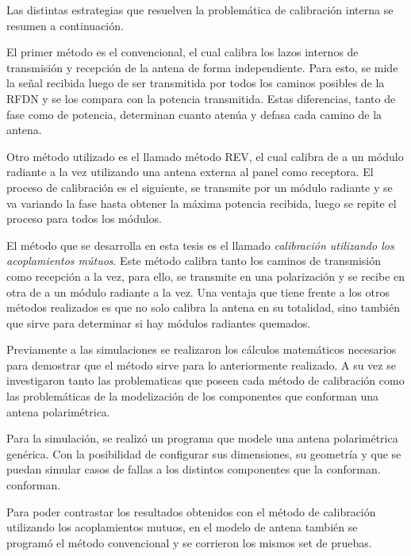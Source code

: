 Las distintas estrategias que resuelven la problemática de calibración interna se resumen a continuación. 

El primer método es el convencional, el cual calibra los lazos internos de transmisión y recepción de la antena de forma 
independiente. Para esto, se mide la señal recibida luego de ser transmitida por todos los caminos posibles de la RFDN
y se los compara con la potencia transmitida. Estas diferencias, tanto de fase como de potencia, determinan cuanto atenúa
y defasa cada camino de la antena.

Otro método utilizado es el llamado método REV, el cual calibra de a un módulo radiante a la vez utilizando una antena externa
al panel como receptora. El proceso de calibración es el siguiente, se transmite por un módulo radiante y se va variando la 
fase hasta obtener la máxima potencia recibida, luego se repite el proceso para todos los módulos. 

El método que se desarrolla en esta tesis es el llamado \emph{calibración utilizando los acoplamientos mútuos}. Este método calibra 
tanto los caminos de transmisión como recepción a la vez, para ello, se transmite en una polarización y se recibe en otra de 
a un módulo radiante a la vez. Una ventaja que tiene frente a los otros métodos realizados es que no solo calibra la antena 
en su totalidad, sino también que sirve para determinar si hay módulos radiantes quemados.

Previamente a las simulaciones se realizaron los cálculos matemáticos necesarios para demostrar que el método sirve para 
lo anteriormente realizado. A su vez se investigaron tanto las problematicas que poseen cada método de calibración como
las problemáticas de la modelización de los componentes que conforman una antena polarimétrica.

Para la simulación, se realizó un programa que modele una antena polarimétrica genérica. Con la posibilidad de configurar 
sus dimensiones, su geometría y que se puedan simular casos de fallas a los distintos componentes que la conforman.
conforman.

Para poder contrastar los resultados obtenidos con el método de calibración utilizando los acoplamientos mutuos, en el modelo 
de antena también se programó el método convencional y se corrieron los mismos set de pruebas.

